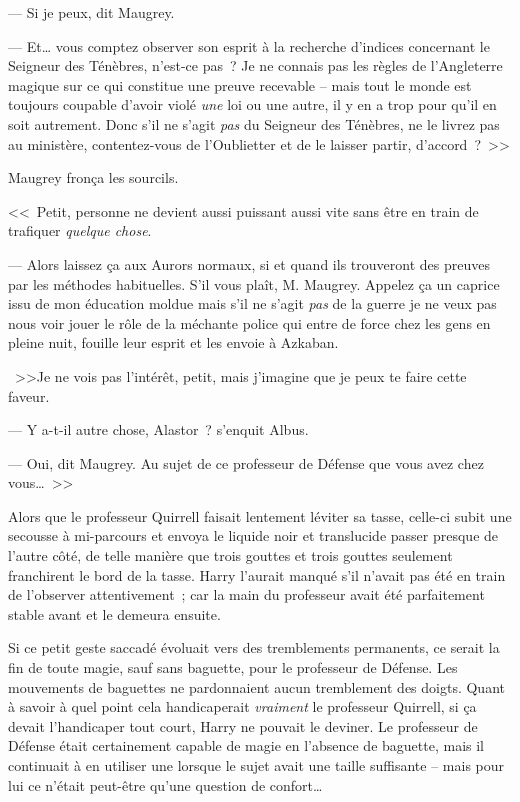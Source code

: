--- Si je peux, dit Maugrey.

--- Et… vous comptez observer son esprit à la recherche d'indices concernant le Seigneur des Ténèbres, n'est-ce pas~? Je ne connais pas les règles de l'Angleterre magique sur ce qui constitue une preuve recevable -- mais tout le monde est toujours coupable d'avoir violé \emph{une} loi ou une autre, il y en a trop pour qu'il en soit autrement. Donc s'il ne s'agit \emph{pas} du Seigneur des Ténèbres, ne le livrez pas au ministère, contentez-vous de l'Oublietter et de le laisser partir, d'accord~?~>>

Maugrey fronça les sourcils.

<<~Petit, personne ne devient aussi puissant aussi vite sans être en train de trafiquer \emph{quelque chose}.

--- Alors laissez ça aux Aurors normaux, si et quand ils trouveront des preuves par les méthodes habituelles. S'il vous plaît, M. Maugrey. Appelez ça un caprice issu de mon éducation moldue mais s'il ne s'agit \emph{pas} de la guerre je ne veux pas nous voir jouer le rôle de la méchante police qui entre de force chez les gens en pleine nuit, fouille leur esprit et les envoie à Azkaban.

~>>Je ne vois pas l'intérêt, petit, mais j'imagine que je peux te faire cette faveur.

--- Y a-t-il autre chose, Alastor~? s'enquit Albus.

--- Oui, dit Maugrey. Au sujet de ce professeur de Défense que vous avez chez vous…~>>



Alors que le professeur Quirrell faisait lentement léviter sa tasse, celle-ci subit une secousse à mi-parcours et envoya le liquide noir et translucide passer presque de l'autre côté, de telle manière que trois gouttes et trois gouttes seulement franchirent le bord de la tasse. Harry l'aurait manqué s'il n'avait pas été en train de l'observer attentivement~; car la main du professeur avait été parfaitement stable avant et le demeura ensuite.

Si ce petit geste saccadé évoluait vers des tremblements permanents, ce serait la fin de toute magie, sauf sans baguette, pour le professeur de Défense. Les mouvements de baguettes ne pardonnaient aucun tremblement des doigts. Quant à savoir à quel point cela handicaperait \emph{vraiment} le professeur Quirrell, si ça devait l'handicaper tout court, Harry ne pouvait le deviner. Le professeur de Défense était certainement capable de magie en l'absence de baguette, mais il continuait à en utiliser une lorsque le sujet avait une taille suffisante -- mais pour lui ce n'était peut-être qu'une question de confort…

